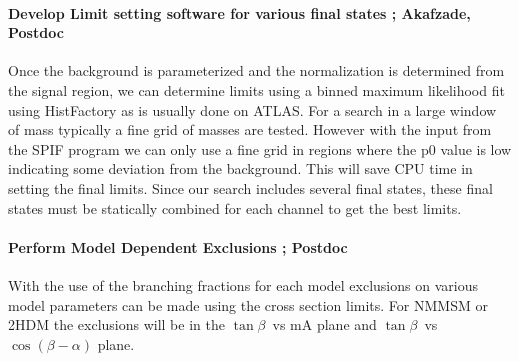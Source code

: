 \documentclass[11pt]{article}
\newcommand{\tanb}{$\tan \beta$}
\begin{document}

\paragraph{Develop Limit setting software for various final states ;  Akafzade, Postdoc} %
Once the background is parameterized and the normalization is determined from the signal region, we can determine limits using a binned maximum likelihood fit using  HistFactory as is usually done on ATLAS. 
For a search in a large window of mass typically a fine grid of masses are tested.  However with the input from the SPIF program we can only use a fine grid in regions where the p0 value is low indicating some deviation
from the background.  This will save CPU time in setting the final limits. 
Since our search includes several final states, these final states must be statically combined for each channel to get the best limits. 

\paragraph{Perform Model Dependent Exclusions ;  Postdoc} %
With the use of the branching fractions for each model exclusions on various model parameters can be made using the cross section limits. For NMMSM or 2HDM the exclusions will be in the \tanb\ vs mA plane and \tanb\ vs $\cos(\beta-\alpha)$ plane.
\end{document}
